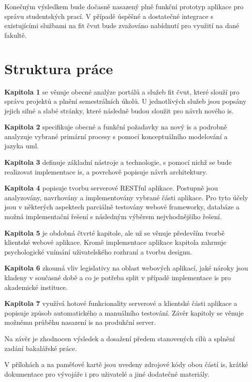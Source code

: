 Konečným výsledkem bude dočasně nasazený plně funkční prototyp aplikace pro správu studentských prací. V případě úspěšné a dostatečné integrace s existujícími službami na \gls{fit} \gls{čvut} bude zvažováno nabídnutí pro využití na dané fakultě.



\clearpage
\section{Struktura práce}

\textbf{Kapitola 1} se věnuje obecné analýze portálů a služeb \gls{fit} \gls{čvut}, které slouží pro správu projektů a plnění semestrálních úkolů. U jednotlivých služeb jsou popsány jejich silné a slabé stránky, které následně budou sloužit pro návrh nového \gls{is}.

\textbf{Kapitola 2} specifikuje obecné a funkční požadavky na nový \gls{is} a podrobně analyzuje vybrané primární procesy s pomocí konceptuálního modelování a jazyka \gls{uml}.

\textbf{Kapitola 3} definuje základní nástroje a technologie, s pomocí nichž se bude realizovat implementace \gls{is}, a povrchově popisuje návrh architektury.

\textbf{Kapitola 4} popisuje tvorbu serverové RESTful aplikace. Postupně jsou analyzovány, navrhovány a implementovány vybrané části aplikace. Pro tyto účely jsou v některých aspektech parciálně testovány webové frameworky, databáze a možná implementační řešení s následným výběrem nejvhodnějšího řešení.

\textbf{Kapitola 5} je obdobná čtvrté kapitole, ale už se věnuje především tvorbě klientské webové aplikace. Kromě implementace aplikace kapitola zahrnuje psychologické vnímání uživatelského rozhraní a tvorbu designu.

\textbf{Kapitola 6} zkoumá vliv legislativy na oblast webových aplikací, jaké nároky jsou kladeny v současné době a co je potřeba split v případě implementace \gls{is} pro akademické instituce.

\textbf{Kapitola 7} využívá hotové funkcionality serverové a klientské části aplikace a popisuje způsob automatického a manuálního testování. Závěr kapitoly se věnuje možnému průběhu nasazení \gls{is} na produkční server.

Na závěr je zhodnocen výsledek a dosažení předem stanovených cílů a splnění zadání bakalářské práce.

V přílohách a na paměťové kartě jsou uvedeny zdrojové kódy obou částí \gls{is}, krátké dokumentace pro vývojáře i pro uživatelé a jiné dodatečné materiály.